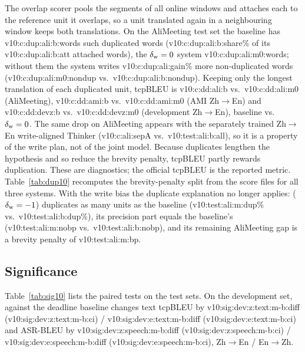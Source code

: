 The overlap scorer pools the segments of all online windows and attaches each to the reference unit it overlaps, so a
unit translated again in a neighbouring window keeps both translations. On the AliMeeting test set the baseline has
\num{v10:c:dup:ali:b:words} such duplicated words (\num{v10:c:dup:ali:b:share}\% of its \num{v10:c:dup:ali:b:att}
attached words), the $\delta_{\mathrm{w}}=0$ system \num{v10:c:dup:ali:m0:words}; without them the system writes
\num{v10:c:dup:ali:gain}\% more non-duplicated words (\num{v10:c:dup:ali:m0:nondup} vs.\ \num{v10:c:dup:ali:b:nondup}). Keeping
only the longest translation of each duplicated unit, tcpBLEU is \num{v10:c:dd:ali:b} vs.\ \num{v10:c:dd:ali:m0}
(AliMeeting), \num{v10:c:dd:ami:b} vs.\ \num{v10:c:dd:ami:m0} (AMI Zh$\rightarrow$En) and \num{v10:c:dd:devz:b} vs.\
\num{v10:c:dd:devz:m0} (development Zh$\rightarrow$En), baseline vs.\ $\delta_{\mathrm{w}}=0$. The same drop on AliMeeting appears with
the separately trained Zh$\rightarrow$En write-aligned Thinker (\num{v10:c:ali:sepA} vs.\ \num{v10:test:ali:b:all}), so it
is a property of the write plan, not of the joint model. Because duplicates lengthen the hypothesis and so reduce the brevity
penalty, tcpBLEU partly rewards duplication. These are diagnostics; the official tcpBLEU is the reported
metric. Table~\ref{tab:dup10} recomputes the brevity-penalty split from the score files for all three systems. With
the write bias the duplicate explanation no longer applies: \sys{} ($\delta_{\mathrm{w}}=-1$) duplicates as many units as the
baseline (\num{v10:test:ali:m:dup}\% vs.\ \num{v10:test:ali:b:dup}\%), its precision part equals the baseline's
(\num{v10:test:ali:m:nobp} vs.\ \num{v10:test:ali:b:nobp}), and its remaining AliMeeting gap is a brevity penalty of
\num{v10:test:ali:m:bp}.



\subsection{Significance}
\label{app:sig10}



Table~\ref{tab:sig10} lists the paired tests on the test sets. On the development set, \sys{} against the deadline
baseline changes text tcpBLEU by \num{v10:sig:dev:z:text:m-b:diff} (\num{v10:sig:dev:z:text:m-b:ci}) /
\num{v10:sig:dev:e:text:m-b:diff} (\num{v10:sig:dev:e:text:m-b:ci}) and ASR-BLEU by
\num{v10:sig:dev:z:speech:m-b:diff} (\num{v10:sig:dev:z:speech:m-b:ci}) / \num{v10:sig:dev:e:speech:m-b:diff}
(\num{v10:sig:dev:e:speech:m-b:ci}), Zh$\rightarrow$En / En$\rightarrow$Zh.

